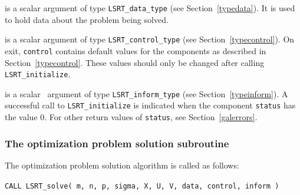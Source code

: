 \documentclass{galahad}
\newcommand{\packagename}{LS\-RT}
\begin{document}
\begin{description}

 is a scalar \intentinout argument of type
{\tt \packagename\_data\_type}
(see Section~\ref{typedata}). It is used to hold data about the problem being
solved.

 is a scalar \intentout argument of type
{\tt \packagename\_control\_type}
(see Section~\ref{typecontrol}).
On exit, {\tt control} contains default values for the components as
described in Section~\ref{typecontrol}.
These values should only be changed after calling
{\tt \packagename\_initialize}.

 is a scalar \intentout\ argument of type
{\tt \packagename\_inform\_type}
(see Section~\ref{typeinform}). A successful call to
{\tt \packagename\_initialize}
is indicated when the  component {\tt status} has the value 0.
For other return values of {\tt status}, see Section~\ref{galerrors}.

\end{description}


\subsubsection{The optimization problem solution subroutine}
The optimization problem solution algorithm is called as follows:

\hskip0.5in
{\tt CALL \packagename\_solve( m, n, p, sigma, X, U, V, data, control, inform )}
\end{document}
